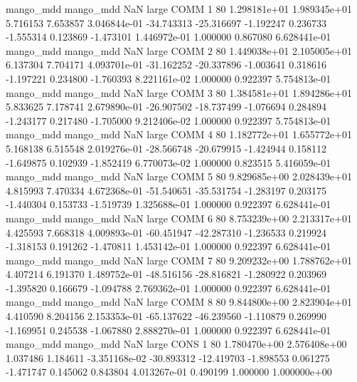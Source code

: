 mango_mdd mango_mdd                   NaN      large     COMM                 1 80 1.298181e+01   1.989345e+01      5.716153       7.653857  3.046844e-01    -34.743313    -25.316697    -1.192247       0.236733 -1.555314   0.123869    -1.473101   1.446972e-01            1.000000        0.867080        6.628441e-01
mango_mdd mango_mdd                   NaN      large     COMM                 2 80 1.449038e+01   2.105005e+01      6.137304       7.704171  4.093701e-01    -31.162252    -20.337896    -1.003641       0.318616 -1.197221   0.234800    -1.760393   8.221161e-02            1.000000        0.922397        5.754813e-01
mango_mdd mango_mdd                   NaN      large     COMM                 3 80 1.384581e+01   1.894286e+01      5.833625       7.178741  2.679890e-01    -26.907502    -18.737499    -1.076694       0.284894 -1.243177   0.217480    -1.705000   9.212406e-02            1.000000        0.922397        5.754813e-01
mango_mdd mango_mdd                   NaN      large     COMM                 4 80 1.182772e+01   1.655772e+01      5.168138       6.515548  2.019276e-01    -28.566748    -20.679915    -1.424944       0.158112 -1.649875   0.102939    -1.852419   6.770073e-02            1.000000        0.823515        5.416059e-01
mango_mdd mango_mdd                   NaN      large     COMM                 5 80 9.829685e+00   2.028439e+01      4.815993       7.470334  4.672368e-01    -51.540651    -35.531754    -1.283197       0.203175 -1.440304   0.153733    -1.519739   1.325688e-01            1.000000        0.922397        6.628441e-01
mango_mdd mango_mdd                   NaN      large     COMM                 6 80 8.753239e+00   2.213317e+01      4.425593       7.668318  4.009893e-01    -60.451947    -42.287310    -1.236533       0.219924 -1.318153   0.191262    -1.470811   1.453142e-01            1.000000        0.922397        6.628441e-01
mango_mdd mango_mdd                   NaN      large     COMM                 7 80 9.209232e+00   1.788762e+01      4.407214       6.191370  1.489752e-01    -48.516156    -28.816821    -1.280922       0.203969 -1.395820   0.166679    -1.094788   2.769362e-01            1.000000        0.922397        6.628441e-01
mango_mdd mango_mdd                   NaN      large     COMM                 8 80 9.844800e+00   2.823904e+01      4.410590       8.204156  2.153353e-01    -65.137622    -46.239560    -1.110879       0.269990 -1.169951   0.245538    -1.067880   2.888270e-01            1.000000        0.922397        6.628441e-01
mango_mdd mango_mdd                   NaN      large     CONS                 1 80 1.780470e+00   2.576408e+00      1.037486       1.184611 -3.351168e-02    -30.893312    -12.419703    -1.898553       0.061275 -1.471747   0.145062     0.843804   4.013267e-01            0.490199        1.000000        1.000000e+00
